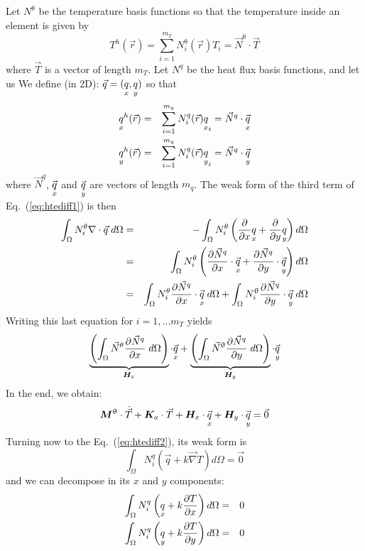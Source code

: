 Let $N^\uptheta$ be the temperature basis functions so that the temperature inside an element is 
given by
\begin{equation}
T^h({\vec r}) = \sum_{i=1}^{m_T} N^\uptheta_i ({\vec r}) T_i = \vec N^\uptheta \cdot \vec T
\end{equation}
where $\vec T$ is a vector of length $m_T$.
Let $N^q$ be the heat flux basis functions, and let us We define (in 2D): $\vec{q}=(\underset{\tiny x}{q},\underset{\tiny y}{q})$ so that 
\begin{eqnarray}
\underset{\tiny x}{q}^h({\vec r}) &=& \sum_{i=1}^{m_q} N^q_i ({\vec r}) \underset{\tiny x}{q}_i = \vec{N}^q \cdot \vec{\underset{\tiny x}{q}} \\
\underset{\tiny y}{q}^h({\vec r}) &=& \sum_{i=1}^{m_q} N^q_i ({\vec r}) \underset{\tiny y}{q}_i = \vec{N}^q \cdot \vec{\underset{\tiny y}{q}} 
\end{eqnarray}
where $\vec{N}^q$, $\vec{\underset{\tiny x}{q}}$ and $\vec{\underset{\tiny y}{q}}$ are vectors of length $m_q$.
The weak form of the third term of Eq.~(\ref{eq:htediff1}) is then
\begin{eqnarray}
\int_\Omega N_i^\theta  \nabla \cdot \vec{q} \;  d\Omega
&=& -\int_\Omega N_i^\theta  
\left(  \frac{\partial }{\partial x}\underset{\tiny x}{q} + \frac{\partial }{\partial y}\underset{\tiny y}{q} \right) d\Omega \nonumber\\
&=& \int_\Omega N_i^\theta  \left(  \frac{\partial \vec{N}^q}{\partial x}\cdot \vec{\underset{\tiny x}{q}}
+  \frac{\partial \vec{N}^q}{\partial y}\cdot \vec{\underset{\tiny y}{q}} \right) d\Omega \nonumber\\
&=& \int_\Omega N_i^\theta  \frac{\partial \vec{N}^q}{\partial x}\cdot  \vec{\underset{\tiny x}{q}} \;  d\Omega + 
\int_\Omega  N_i^\uptheta \frac{\partial \vec{N}^q}{\partial y} \cdot \vec{\underset{\tiny y}{q}} \;  d\Omega \nonumber
\end{eqnarray}
Writing this last equation for $i=1,...m_T$ yields
\[
\underbrace{\left( \int_\Omega \vec{N}^\theta  \frac{\partial \vec{N}^q}{\partial x} \; d\Omega \right)}_{{\bm H}_x} \cdot\vec{\underset{\tiny x}{q}}+ 
\underbrace{\left( \int_\Omega  \vec{N}^\uptheta \frac{\partial \vec{N}^q}{\partial y}  \;  d\Omega\right)}_{{\bm H}_y} \cdot \vec{\underset{\tiny y}{q}}
\]
In the end, we obtain:
\begin{equation}
{\bm M}^\uptheta \cdot \dot{\vec{T}} + {\bm K}_a \cdot \vec{T} 
+ {\bm H}_x \cdot \vec{\underset{\tiny x}{q}}
+ {\bm H}_y \cdot \vec{\underset{\tiny y}{q}}
=\vec{0} \label{eq:htediff3}
\end{equation}
Turning now to the Eq.~(\ref{eq:htediff2}), its weak form is
\[
\int_\Omega N_i^q \left( \vec{q} + k \vec \nabla T \right) d\Omega = \vec{0}
\]
and we can decompose in its $x$ and $y$ components:
\begin{eqnarray}
\int_\Omega N_i^q \left( \underset{\tiny x}{q} + k  \frac{\partial T}{\partial x} \right) d\Omega &=& 0 \nonumber\\
\int_\Omega N_i^q \left( \underset{\tiny y}{q} + k  \frac{\partial T}{\partial y} \right) d\Omega &=& 0 \nonumber
\end{eqnarray}
